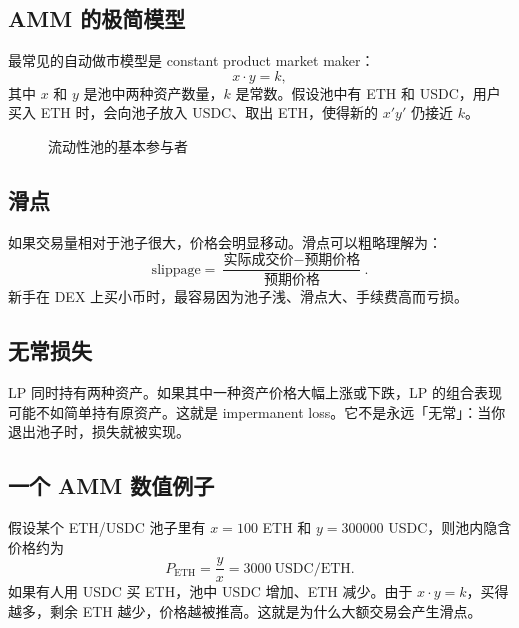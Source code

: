 \documentclass[UTF8,11pt]{ctexart}
\begin{document}
\subsection{AMM 的极简模型}

最常见的自动做市模型是 constant product market maker：
\[
x \cdot y = k,
\]
其中 \(x\) 和 \(y\) 是池中两种资产数量，\(k\) 是常数。假设池中有 ETH 和 USDC，用户买入 ETH 时，会向池子放入 USDC、取出 ETH，使得新的 \(x'y'\) 仍接近 \(k\)。

\begin{figure}[h]
\centering
{}
\caption{流动性池的基本参与者}
\end{figure}

\subsection{滑点}

如果交易量相对于池子很大，价格会明显移动。滑点可以粗略理解为：
\[
\text{slippage}=\frac{\text{实际成交价}-\text{预期价格}}{\text{预期价格}}.
\]
新手在 DEX 上买小币时，最容易因为池子浅、滑点大、手续费高而亏损。

\subsection{无常损失}

LP 同时持有两种资产。如果其中一种资产价格大幅上涨或下跌，LP 的组合表现可能不如简单持有原资产。这就是 impermanent loss。它不是永远「无常」：当你退出池子时，损失就被实现。

\subsection{一个 AMM 数值例子}

假设某个 ETH/USDC 池子里有 \(x=100\) ETH 和 \(y=300000\) USDC，则池内隐含价格约为
\[
P_{\text{ETH}}=\frac{y}{x}=3000\ \text{USDC/ETH}.
\]
如果有人用 USDC 买 ETH，池中 USDC 增加、ETH 减少。由于 \(x\cdot y=k\)，买得越多，剩余 ETH 越少，价格越被推高。这就是为什么大额交易会产生滑点。
\end{document}
